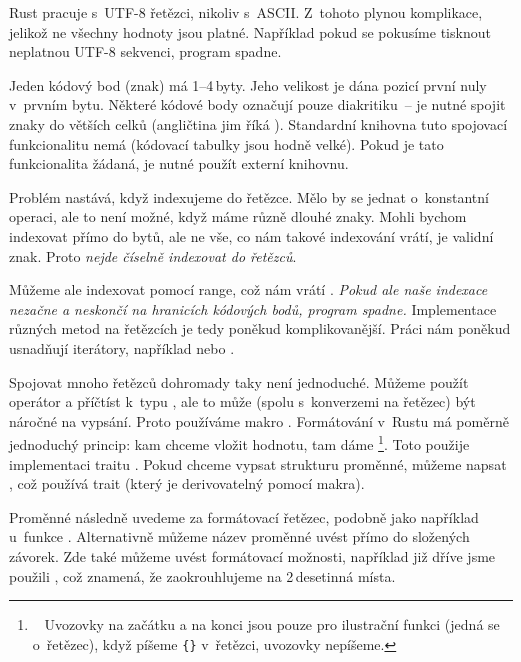 \documentclass[main.tex]{subfiles}
\begin{document}

Rust pracuje s~UTF-8 řetězci, nikoliv s~ASCII. Z~tohoto plynou komplikace, jelikož ne
všechny hodnoty jsou platné. Například pokud se pokusíme tisknout neplatnou UTF-8
sekvenci, program spadne.


Jeden kódový bod (znak) má 1--4\,byty. Jeho velikost je dána pozicí první nuly v~prvním
bytu. Některé kódové body označují pouze diakritiku~-- je nutné spojit znaky do větších
celků (angličtina jim říká ). Standardní knihovna tuto spojovací
funkcionalitu nemá (kódovací tabulky jsou hodně velké). Pokud je tato funkcionalita
žádaná, je nutné použít externí knihovnu. \cite[sekce\,8.2]{thebook}


Problém nastává, když indexujeme do řetězce. Mělo by se jednat o~konstantní operaci, ale
to není možné, když máme různě dlouhé znaky. Mohli bychom indexovat přímo do bytů, ale ne
vše, co nám takové indexování vrátí, je validní znak. Proto
\emph{nejde číselně indexovat do řetězců}.

Můžeme ale indexovat pomocí range, což nám vrátí . \emph{Pokud ale naše
    indexace nezačne a neskončí na hranicích kódových bodů, program spadne.} Implementace
různých metod na řetězcích je tedy poněkud komplikovanější. Práci nám poněkud usnadňují
iterátory, například  nebo . \cite[sekce\,8.2]{thebook}


Spojovat mnoho řetězců dohromady taky není jednoduché. Můžeme použít \irust{+} operátor a
příčtíst  k~typu , ale to může (spolu s~konverzemi na řetězec)
být náročné na vypsání. Proto používáme makro . Formátování v~Rustu má
poměrně jednoduchý princip: kam chceme vložit hodnotu, tam dáme \footnote{~
    Uvozovky na začátku a na konci jsou pouze pro ilustrační funkci (jedná se o~řetězec),
    když píšeme \texttt{\{\}} v~řetězci, uvozovky nepíšeme.
}. Toto použije implementaci traitu . Pokud chceme vypsat strukturu
proměnné, můžeme napsat , což používá  trait (který je
derivovatelný pomocí makra). \cite[sekce\,8.2]{thebook}

Proměnné následně uvedeme za formátovací řetězec, podobně jako například u~funkce
. Alternativně můžeme název proměnné uvést přímo do složených závorek. Zde
také můžeme uvést formátovací možnosti, například již dříve jsme použili ,
což znamená, že zaokrouhlujeme na 2\,desetinná místa.
\end{document}
